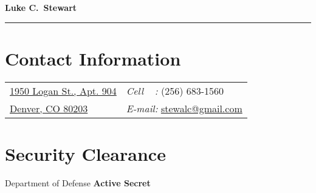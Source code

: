 \documentclass[8pt]{article}
\newcommand{\makeheading}[1]%
        {\hspace*{-\marginparsep minus \marginparwidth}%
         \begin{minipage}[t]{\textwidth+\marginparwidth+\marginparsep}%
                {\large \bfseries #1}\\[-0.15\baselineskip]%
                 \rule{\columnwidth}{1pt}%
         \end{minipage}}
\newcommand{\blankline}{\quad\pagebreak[2]}
\begin{document}
\makeheading{Luke C.~Stewart}

\section{\textbf{Contact Information}}
%
%
%
\newlength{\rcollength}\setlength{\rcollength}{1.85in}%
%


\begin{tabular}[t]{@{}p{\textwidth-\rcollength}p{\rcollength}}
\href{http://maps.google.com/maps?rls=en&q=1950+logan+st+denver+co}{1950 Logan St., Apt. 904}      & \textit{Cell\,\,\,\,\,\,\,:} (256) 683-1560 \\
\href{http://maps.google.com/maps?rls=en&q=1950+logan+st+denver+co}{Denver, CO 80203}               & \textit{E-mail:}
\href{mailto:stewalc@gmail.com}{stewalc@gmail.com}\\
\end{tabular}


\section{\textbf{Security Clearance}}
%
Department of Defense \textbf{Active Secret}\\\\
\blankline
\end{document}
